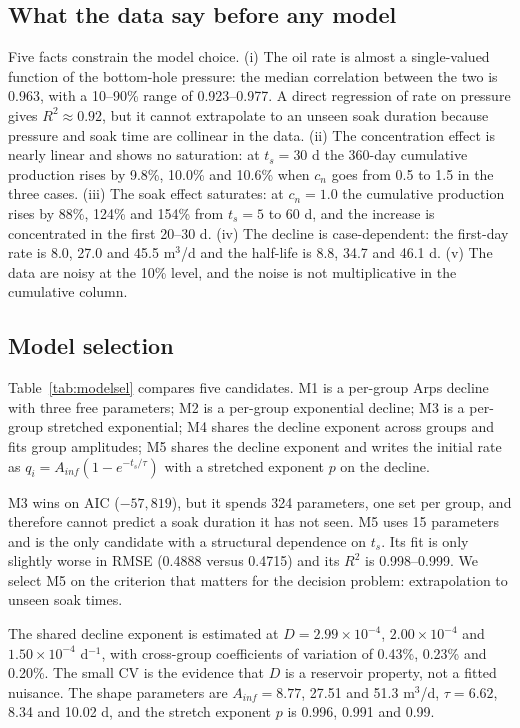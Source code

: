 \documentclass{swmcmthesis}
\begin{document}
\subsection{What the data say before any model}
Five facts constrain the model choice. (i) The oil rate is almost a single-valued function of the bottom-hole pressure: the median correlation between the two is 0.963, with a 10--90\% range of 0.923--0.977. A direct regression of rate on pressure gives $R^2\approx0.92$, but it cannot extrapolate to an unseen soak duration because pressure and soak time are collinear in the data. (ii) The concentration effect is nearly linear and shows no saturation: at $t_s=30$ d the 360-day cumulative production rises by 9.8\%, 10.0\% and 10.6\% when $c_n$ goes from 0.5 to 1.5 in the three cases. (iii) The soak effect saturates: at $c_n=1.0$ the cumulative production rises by 88\%, 124\% and 154\% from $t_s=5$ to 60 d, and the increase is concentrated in the first 20--30 d. (iv) The decline is case-dependent: the first-day rate is 8.0, 27.0 and 45.5 m$^3$/d and the half-life is 8.8, 34.7 and 46.1 d. (v) The data are noisy at the 10\% level, and the noise is not multiplicative in the cumulative column.

\subsection{Model selection}
Table~\ref{tab:modelsel} compares five candidates. M1 is a per-group Arps decline with three free parameters; M2 is a per-group exponential decline; M3 is a per-group stretched exponential; M4 shares the decline exponent across groups and fits group amplitudes; M5 shares the decline exponent and writes the initial rate as $q_i=A_{inf}(1-e^{-t_s/\tau})$ with a stretched exponent $p$ on the decline.

M3 wins on AIC ($-57{,}819$), but it spends 324 parameters, one set per group, and therefore cannot predict a soak duration it has not seen. M5 uses 15 parameters and is the only candidate with a structural dependence on $t_s$. Its fit is only slightly worse in RMSE (0.4888 versus 0.4715) and its $R^2$ is 0.998--0.999. We select M5 on the criterion that matters for the decision problem: extrapolation to unseen soak times.




The shared decline exponent is estimated at $D=2.99\times10^{-4}$, $2.00\times10^{-4}$ and $1.50\times10^{-4}$ d$^{-1}$, with cross-group coefficients of variation of 0.43\%, 0.23\% and 0.20\%. The small CV is the evidence that $D$ is a reservoir property, not a fitted nuisance. The shape parameters are $A_{inf}=8.77$, 27.51 and 51.3 m$^3$/d, $\tau=6.62$, 8.34 and 10.02 d, and the stretch exponent $p$ is 0.996, 0.991 and 0.99.
\end{document}
